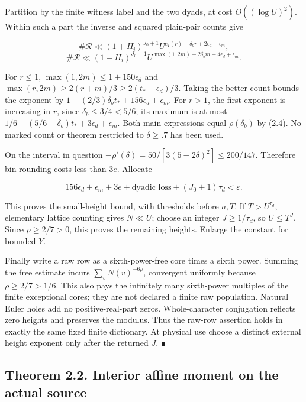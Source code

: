 \documentclass[11pt,a4paper]{article}
\begin{document}
Partition by the finite witness label and the two dyads, at cost
\(O((\log U)^2)\). Within such a part the inverse and squared plain-pair
counts give

\[
\#\mathcal R\ll(1+H_i)^{J_0+1}
 U^{e_I(r)-\delta_b r+2\epsilon_d+\epsilon_m},
\] \[
\#\mathcal R\ll(1+H_i)^{J_0+1}
 U^{\max(1,2m)-2\delta_b m+4\epsilon_d+\epsilon_m}.
\tag{2.5}
\]

For \(r\le1\), \(\max(1,2m)\le1+150\epsilon_d\) and
\(\max(r,2m)\ge2(r+m)/3\ge2(t_*-\epsilon_d)/3\). Taking the better count
bounds the exponent by \(1-(2/3)\delta_b t_*+156\epsilon_d+\epsilon_m\).
For \(r>1\), the first exponent is increasing in \(r\), since
\(\delta_b\le3/4<5/6\); its maximum is at most
\(1/6+(5/6-\delta_b)t_*+3\epsilon_d+\epsilon_m\). Both main expressions
equal \(\rho(\delta_b)\) by (2.4). No marked count or theorem restricted
to \(\delta\ge.7\) has been used.

On the interval in question
\(-\rho'(\delta)=50/[3(5-2\delta)^2]\le200/147\). Therefore bin rounding
costs less than \(3e\). Allocate

\[
156\epsilon_d+\epsilon_m+3e+\text{dyadic loss}+(J_0+1)\tau_d<\varepsilon.
\tag{2.6}
\]

This proves the small-height bound, with thresholds before \(a,T\). If
\(T>U^{\tau_d}\), elementary lattice counting gives \(N\ll U\); choose
an integer \(J\ge1/\tau_d\), so \(U\le T^J\). Since \(\rho\ge2/7>0\),
this proves the remaining heights. Enlarge the constant for bounded
\(Y\).

Finally write a raw row as a sixth-power-free core times a sixth power.
Summing the free estimate incurs \(\sum_v N(v)^{-6\rho}\), convergent
uniformly because \(\rho\ge2/7>1/6\). This also pays the infinitely many
sixth-power multiples of the finite exceptional cores; they are not
declared a finite raw population. Natural Euler holes add no
positive-real-part zeros. Whole-character conjugation reflects zero
heights and preserves the modulus. Thus the raw-row assertion holds in
exactly the same fixed finite dictionary. At physical use choose a
distinct external height exponent only after the returned \(J\). ∎

\hypertarget{theorem-2.2.-interior-affine-moment-on-the-actual-source}{%
\subsection{Theorem 2.2. Interior affine moment on the actual
source}\label{theorem-2.2.-interior-affine-moment-on-the-actual-source}}
\end{document}
